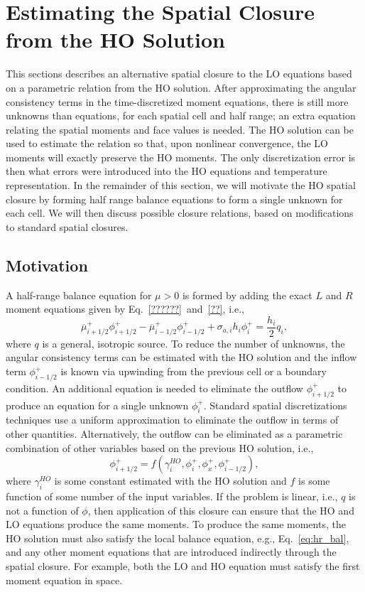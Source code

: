 
\section{Estimating the Spatial Closure from the HO Solution}
\label{sec:spat_clos}

This sections describes an alternative spatial closure to the LO equations based on 
a parametric relation from the HO solution. 
After approximating the angular consistency terms in the time-discretized moment equations, 
there is still more unknowns than equations, for each spatial
cell and half range; an extra equation relating the spatial moments and face values is
needed.  The HO solution can be used to estimate the relation so that, upon nonlinear
convergence, the LO moments will exactly preserve the HO moments.  The only discretization
error is then what errors were introduced into the HO equations and temperature representation.
In the remainder of this section, we will motivate the HO spatial closure by forming half
range balance equations to form a single unknown for each cell.  We will then discuss
possible closure relations, based on modifications to standard spatial closures.

\subsection{Motivation}

A half-range balance equation for $\mu>0$ is formed by adding the
exact $L$ and
$R$ moment equations given by Eq.~\eqref{??????}~and~\eqref{??}, i.e.,
\begin{equation}\label{eq:hr_bal}
    \overline\mu^+_{i+1/2}\phi_{i+1/2}^+ - \overline\mu^+_{i-1/2}\phi_{i-1/2}^+ +
    {\sigma_{a,i}h_i} \phi_i^+ = \frac{h_i}{2} q_i,
\end{equation}
where $q$ is a general, isotropic source.  To reduce the number of unknowns, the angular consistency terms can be estimated
with the HO solution and the inflow term $\phi_{i-1/2}^+$ is known via upwinding from the previous
cell or a boundary condition.  An additional equation is needed to eliminate the outflow $\phi_{i+1/2}^+$ to produce an
equation for a single unknown $\phi_{i}^+$.  Standard spatial discretizations techniques
use a uniform approximation to eliminate the outflow in terms of other quantities.  Alternatively, the outflow can be eliminated as a parametric
combination of other variables based on the previous HO solution, i.e.,
\begin{equation}
    \phi_{i+1/2}^+ = f(\gamma^{HO}_i, \phi_i^+, \phi_x^+, \phi_{i-1/2}^+),
\end{equation}
where $\gamma^{HO}_i$ is some constant estimated with the HO solution and $f$ is some
function of some number of the input
variables.  If the problem is linear, i.e., $q$ is not a function of $\phi$, then application of this
closure can ensure that the HO and LO equations produce the same moments.  To produce the
same moments, the HO solution must also satisfy the local balance equation, e.g.,
Eq.~\eqref{eq:hr_bal}, and any other moment equations that are introduced indirectly
through the spatial closure.  For example, both the LO and HO equation must satisfy the
first moment equation in space.  

